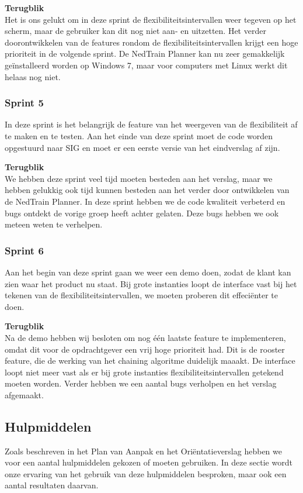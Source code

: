 \textbf{Terugblik} \\
Het is ons gelukt om in deze sprint de flexibiliteitsintervallen weer tegeven op het scherm, maar de gebruiker kan dit nog niet aan- en uitzetten. Het verder doorontwikkelen van de features rondom de flexibiliteitsintervallen krijgt een hoge prioriteit in de volgende sprint. De NedTrain Planner kan nu zeer gemakkelijk ge\"installeerd worden op Windows 7, maar voor computers met Linux werkt dit helaas nog niet. 

\subsubsection{Sprint 5}
In deze sprint is het belangrijk de feature van het weergeven van de flexibiliteit af te maken en te testen. Aan het einde van deze sprint moet de code worden opgestuurd naar SIG en moet er een eerste versie van het eindverslag af zijn. 

\textbf{Terugblik} \\
We hebben deze sprint veel tijd moeten besteden aan het verslag, maar we hebben gelukkig ook tijd kunnen besteden aan het verder door ontwikkelen van de NedTrain Planner. In deze sprint hebben we de code kwaliteit verbeterd en bugs ontdekt de vorige groep heeft achter gelaten. Deze bugs hebben we ook meteen weten te verhelpen.

\subsubsection{Sprint 6}
Aan het begin van deze sprint gaan we weer een demo doen, zodat de klant kan zien waar het product nu staat. Bij grote instanties loopt de interface vast bij het tekenen van de flexibiliteitsintervallen, we moeten proberen dit effeci\"enter te doen.

\textbf{Terugblik} \\
Na de demo hebben wij besloten om nog \'e\'en laatste feature te implementeren, omdat dit voor de opdrachtgever een vrij hoge prioriteit had. Dit is de rooster feature, die de werking van het chaining algoritme duidelijk maaakt. De interface loopt niet meer vast als er bij grote instanties flexibiliteitsintervallen getekend moeten worden. Verder hebben we een aantal bugs verholpen en het verslag afgemaakt. 

\subsection{Hulpmiddelen}
Zoals beschreven in het Plan van Aanpak en het Ori\"entatieverslag hebben we voor een aantal hulpmiddelen gekozen of moeten gebruiken. In deze sectie wordt onze ervaring van het gebruik van deze hulpmiddelen besproken, maar ook een aantal resultaten daarvan. 

